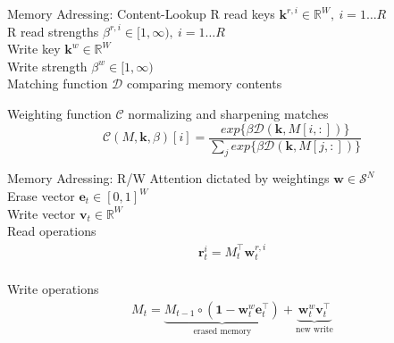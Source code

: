 \documentclass{beamer}
\begin{document}
\begin{frame}{Memory Adressing: Content-Lookup}
	\alert{R read keys} $\pmb{k}^{r,i} \in \mathbb{R}^W,\ i=1\dots R$\\
	\alert{R read strengths} $\beta^{r,i} \in [1,\infty),\ i=1\dots R$\\
	\alert{Write key} $\pmb{k}^{w} \in \mathbb{R}^W$\\
	\alert{Write strength} $\beta^{w} \in [1,\infty)$\\
	
	\pause
	\alert{Matching function} $\mathcal{D}$ comparing memory contents
	
	\pause
	\alert{Weighting function} $\mathcal{C}$ normalizing and sharpening matches
	\[
	\mathcal{C}(M,\pmb{k},\beta)[i]= 
	\frac {exp \{\beta\mathcal{D} (\pmb{k},M[i,:])\} }
	{ \sum_{j}{exp \{\beta\mathcal{D} (\pmb{k},M[j,:]) \}}}
	\]
\end{frame}

\begin{frame}{Memory Adressing: R/W}
	\alert{Attention} dictated by weightings $\pmb{w} \in \mathcal{S}^N$\\
	\alert{Erase vector} $\pmb{e}_t \in [0,1]^W$\\
	\alert{Write vector} $\pmb{v}_t \in \mathbb{R}^W$\\

	\alert{Read operations}
	\begin{align*}
	 \pmb{r}_t^i = M_t^\top\pmb{w}_t^{r,i} \\ 
	\end{align*}
	
	\pause
	\alert{Write operations}
	\begin{align*}
	M_t = \underbrace{M_{t-1} \circ (\pmb{1} - \pmb{w}_t^w\pmb{e}_t^\top)}_{\text{erased memory}} + 
	\underbrace{\pmb{w}_t^w\pmb{v}_t^\top}_{\text{new write}}
	\end{align*}
\end{frame}
\end{document}
